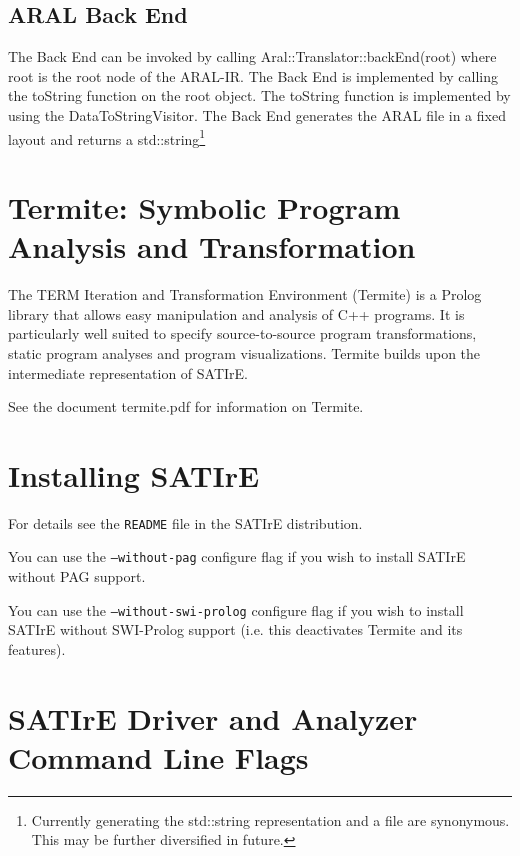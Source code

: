 \documentclass[a4paper,12pt]{report}
\begin{document}
\section{ARAL Back End}

The Back End can be invoked by calling Aral::Translator::backEnd(root)
where root is the root node of the ARAL-IR. The Back End is
implemented by calling the toString function on the root object. The
toString function is implemented by using the DataToStringVisitor.
The Back End generates the ARAL file in a fixed layout and returns a
std::string\footnote{Currently generating the std::string representation and a file
are synonymous. This may be further diversified in future.}


\chapter{Termite: Symbolic Program Analysis and Transformation}
\label{chap:termite}

The TERM Iteration and Transformation Environment (Termite) is a
Prolog library that allows easy manipulation and analysis of C++
programs. It is particularly well suited to specify source-to-source
program transformations, static program analyses and program
visualizations. Termite builds upon the intermediate representation of
SATIrE.

See the document termite.pdf for information on Termite. 




\appendix

\chapter{Installing SATIrE}
\label{appendix:installing}

For details see the \texttt{README} file in the SATIrE distribution. 

You can use the \texttt{--without-pag} configure flag if you wish to install
SATIrE without PAG support.

You can use the \texttt{--without-swi-prolog} configure flag if you wish to
install SATIrE without SWI-Prolog support (i.e. this deactivates
Termite and its features).

\chapter{SATIrE Driver and Analyzer Command Line Flags}
\label{appendix:command_line}
\end{document}
